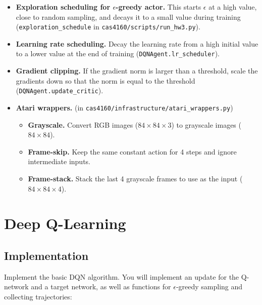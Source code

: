 \documentclass{article}
\begin{document}
\begin{itemize}
    \item \textbf{Exploration scheduling for $\epsilon$-greedy actor.} This starts $\epsilon$ at a high value, close to random sampling, and decays it to a small value during training (\verb|exploration_schedule| in \verb|cas4160/scripts/run_hw3.py|).
    \item \textbf{Learning rate scheduling.} Decay the learning rate from a high initial value to a lower value at the end of training (\verb|DQNAgent.lr_scheduler|).
    \item \textbf{Gradient clipping.} If the gradient norm is larger than a threshold, scale the gradients down so that the norm is equal to the threshold (\verb|DQNAgent.update_critic|).
    \item \textbf{Atari wrappers.} (in \verb|cas4160/infrastructure/atari_wrappers.py|)
    \begin{itemize}
        \item \textbf{Grayscale.} Convert RGB images ($84\times84\times3$) to grayscale images ($84\times84$).
        \item \textbf{Frame-skip.} Keep the same constant action for 4 steps and ignore intermediate inputs.
        \item \textbf{Frame-stack.} Stack the last 4 grayscale frames to use as the input ($84\times84\times4$).
    \end{itemize}
\end{itemize}



\section{Deep Q-Learning}

\subsection{Implementation}

Implement the basic DQN algorithm. You will implement an update for the Q-network and a target network, as well as functions for $\epsilon$-greedy sampling and collecting trajectories:
\end{document}
